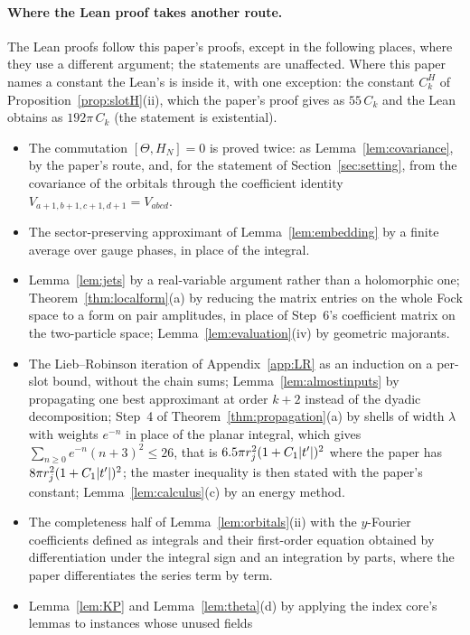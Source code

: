 \paragraph{Where the Lean proof takes another route.} The Lean proofs follow this paper's proofs, except in the following
places, where they use a different argument; the statements are unaffected. Where this paper names a constant the Lean's is
inside it, with one exception: the constant $C^H_k$ of Proposition~\ref{prop:slotH}(ii), which the paper's proof gives as
$55\,C_k$ and the Lean obtains as $192\pi\,C_k$ (the statement is existential).
\begin{itemize}[leftmargin=*]
\item The commutation $[\Theta,H_N]=0$ is proved twice: as Lemma~\ref{lem:covariance}, by the paper's route, and, for the
statement of Section~\ref{sec:setting}, from the covariance of the orbitals through the coefficient identity
$V_{a+1,b+1,c+1,d+1}=V_{abcd}$.
\item The sector-preserving approximant of Lemma~\ref{lem:embedding} by a finite average over gauge phases, in place of the
integral.
\item Lemma~\ref{lem:jets} by a real-variable argument rather than a holomorphic one; Theorem~\ref{thm:localform}(a) by reducing
the matrix entries on the whole Fock space to a form on pair amplitudes, in place of Step~6's coefficient matrix on the
two-particle space; Lemma~\ref{lem:evaluation}(iv) by geometric majorants.
\item The Lieb--Robinson iteration of Appendix~\ref{app:LR} as an induction on a per-slot bound, without the chain sums;
Lemma~\ref{lem:almostinputs} by propagating one best approximant at order $k+2$ instead of the dyadic decomposition;
Step~4 of Theorem~\ref{thm:propagation}(a) by shells of width $\lambda$ with weights $e^{-n}$ in place of the planar integral,
which gives $\sum_{n\ge0}e^{-n}(n+3)^2\le26$, that is $6.5\pi r_j^2(1+C_1\lvert t'\rvert)^2$ where the paper has
$8\pi r_j^2(1+C_1\lvert t'\rvert)^2$; the master inequality is then stated with the paper's constant; Lemma~\ref{lem:calculus}(c) by an
energy method.
\item The completeness half of Lemma~\ref{lem:orbitals}(ii) with the $y$-Fourier coefficients defined as integrals and their
first-order equation obtained by differentiation under the integral sign and an integration by parts, where the paper
differentiates the series term by term.
\item Lemma~\ref{lem:KP} and Lemma~\ref{lem:theta}(d) by applying the index core's lemmas to instances whose unused fields

\end{itemize}

